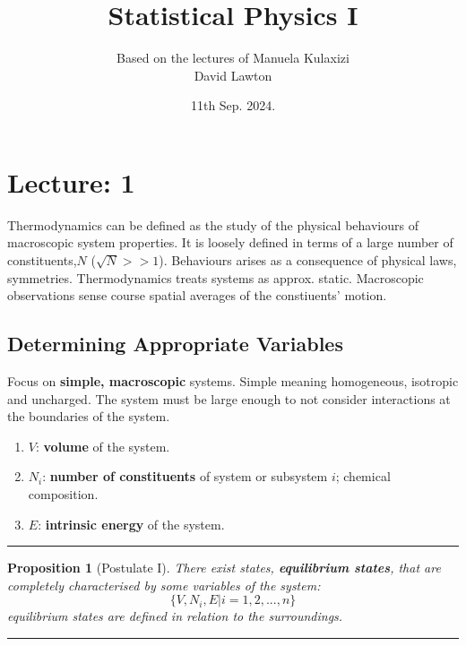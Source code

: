 \documentclass{article}
\title{Statistical Physics I}
\author{Based on the lectures of Manuela Kulaxizi\\David Lawton}
\date{11th Sep. 2024.}
\newtheorem{theorem}{Proposition}[section]
\theoremstyle{definition}
\theoremstyle{remark}
\begin{document}
\maketitle

\tableofcontents

\newpage

\section{Lecture: 1}

Thermodynamics can be defined as the study of the physical behaviours of macroscopic system properties. It is loosely defined in terms of a large number of constituents,$N$ ($\sqrt{N}>>1$). Behaviours arises as a consequence of physical laws, symmetries. Thermodynamics treats systems as approx. static. Macroscopic observations sense course spatial averages of the constiuents' motion.

\subsection[short]{Determining Appropriate Variables}
Focus on \textbf{simple, macroscopic} systems. Simple meaning homogeneous, isotropic and uncharged. The system must be large enough to not consider interactions at the boundaries of the system.
\begin{enumerate}
    \item $V$: \textbf{volume} of the system.
    \item $N_i$: \textbf{number of constituents} of system or subsystem $i$; chemical composition.
    \item $E$: \textbf{intrinsic energy} of the system.
\end{enumerate}
\vspace{0.5cm}
\hrule
\begin{theorem}[Postulate I]
    There exist states, \textbf{equilibrium states}, that are completely characterised by some variables of the system:
    \begin{equation}
        \lbrace V, N_i, E | i = 1,2,...,n\rbrace
    \end{equation}
    equilibrium states are defined in relation to the surroundings.
\end{theorem}
\hrule
\vspace{0.5cm}
\end{document}
